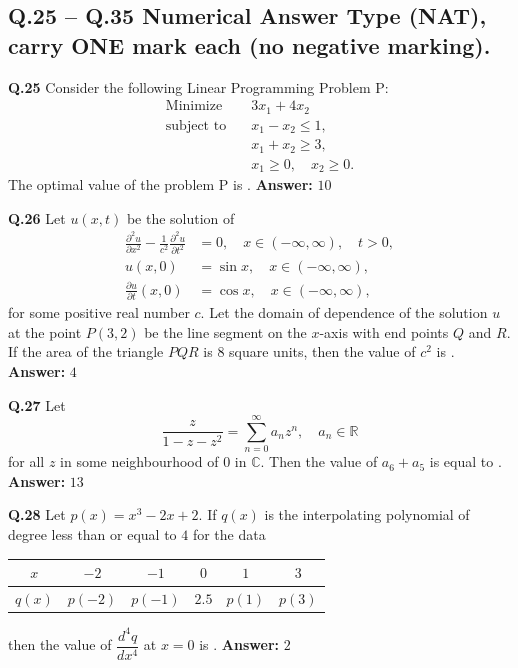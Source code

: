 \documentclass[11pt,a4paper]{article}
\newcommand{\ans}[1]{\textbf{Answer:} #1\par\medskip}
\begin{document}
\subsection*{Q.25 -- Q.35 Numerical Answer Type (NAT), carry ONE mark each (no negative marking).}

\textbf{Q.25} Consider the following Linear Programming Problem P:
\begin{align*}
  \text{Minimize} \quad & 3x_1 + 4x_2 \\
  \text{subject to} \quad & x_1 - x_2 \le 1, \\
  & x_1 + x_2 \ge 3, \\
  & x_1 \ge 0, \quad x_2 \ge 0.
\end{align*}
The optimal value of the problem P is \underline{\hspace{2cm}}.
\ans{$10$}

\textbf{Q.26} Let $u(x, t)$ be the solution of
\begin{align*}
  \frac{\partial^2 u}{\partial x^2} - \frac{1}{c^2} \frac{\partial^2 u}{\partial t^2} &= 0, \quad x \in (-\infty, \infty), \quad t > 0, \\
  u(x, 0) &= \sin x, \quad x \in (-\infty, \infty), \\
  \frac{\partial u}{\partial t}(x, 0) &= \cos x, \quad x \in (-\infty, \infty),
\end{align*}
for some positive real number $c$. Let the domain of dependence of the solution $u$ at the point $P(3, 2)$ be the line segment on the $x$-axis with end points $Q$ and $R$. If the area of the triangle $PQR$ is $8$ square units, then the value of $c^2$ is \underline{\hspace{2cm}}.
\ans{$4$}

\textbf{Q.27} Let
\[
  \frac{z}{1 - z - z^2} = \sum_{n=0}^{\infty} a_n z^n, \quad a_n \in \mathbb{R}
\]
for all $z$ in some neighbourhood of $0$ in $\mathbb{C}$. Then the value of $a_6 + a_5$ is equal to \underline{\hspace{2cm}}.
\ans{$13$}

\textbf{Q.28} Let $p(x) = x^3 - 2x + 2$. If $q(x)$ is the interpolating polynomial of degree less than or equal to $4$ for the data
\begin{center}
\begin{tabular}{cccccc}
\toprule
$x$ & $-2$ & $-1$ & $0$ & $1$ & $3$ \\
\midrule
$q(x)$ & $p(-2)$ & $p(-1)$ & $2.5$ & $p(1)$ & $p(3)$ \\
\bottomrule
\end{tabular}
\end{center}
then the value of $\dfrac{d^4 q}{dx^4}$ at $x = 0$ is \underline{\hspace{2cm}}.
\ans{$2$}
\end{document}
